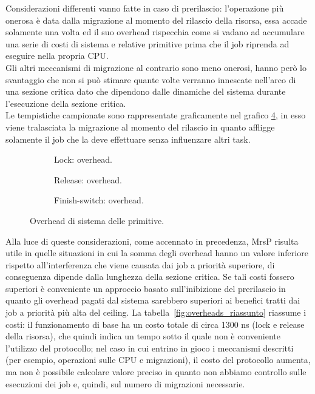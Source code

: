 Considerazioni differenti vanno fatte in caso di prerilascio: l'operazione più onerosa è data dalla migrazione al momento del rilascio della risorsa, essa accade solamente una volta ed il suo overhead rispecchia come si vadano ad accumulare una serie di costi di sistema e relative primitive prima che il job riprenda ad eseguire nella propria CPU.\\

Gli altri meccanismi di migrazione al contrario sono meno onerosi, hanno però lo svantaggio che non si può stimare quante volte verranno innescate nell'arco di una sezione critica dato che dipendono dalle dinamiche del sistema durante l'esecuzione della sezione critica.\\

Le tempistiche campionate sono rappresentate graficamente nel grafico \ref{fig:overheads}, in esso viene tralasciata la migrazione al momento del rilascio in quanto affligge solamente il job che la deve effettuare senza influenzare altri task.\\

  \begin{figure}
    \centering
      \begin{subfigure}[b]{0.49\textwidth}
        \centering
        \resizebox{\linewidth}{!}\overheadsLock
        \caption{Lock: overhead.}
        \label{fig:overheadsLock}
      \end{subfigure}
      \begin{subfigure}[b]{0.36\textwidth}
        \centering
        \resizebox{\linewidth}{!}\overheadsRelease
        \caption{Release: overhead.}
        \label{fig:overheadsUnlock}
      \end{subfigure}
      \begin{subfigure}[b]{0.49\textwidth}
        \centering
        \resizebox{\linewidth}{!}\overheadsFS
        \caption{Finish-switch: overhead.}
        \label{fig:overheadsFS}
      \end{subfigure}
    \caption{Overhead di sistema delle primitive.}
    \label{fig:overheads}
  \end{figure}

Alla luce di queste considerazioni, come accennato in precedenza, MrsP risulta utile in quelle situazioni in cui la somma degli overhead hanno un valore inferiore rispetto all'interferenza che viene causata dai job a priorità superiore, di conseguenza dipende dalla lunghezza della sezione critica. Se tali costi fossero superiori è conveniente un approccio basato sull'inibizione del prerilascio in quanto gli overhead pagati dal sistema sarebbero superiori ai benefici tratti dai job a priorità più alta del ceiling. La tabella~\ref{fig:overheads_riassunto} riassume i costi: il funzionamento di base ha un costo totale di circa 1300 ns (lock e release della risorsa), che quindi indica un tempo sotto il quale non è conveniente l'utilizzo del protocollo; nel caso in cui entrino in gioco i meccanismi descritti (per esempio, operazioni sulle CPU e migrazioni), il costo del protocollo aumenta, ma non è possibile calcolare valore preciso in quanto non abbiamo controllo sulle esecuzioni dei job e, quindi, sul numero di migrazioni necessarie.\\

